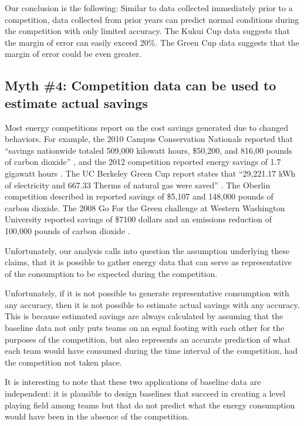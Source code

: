 \documentclass[jou]{apa} %
\begin{document}
Our conclusion is the following: Similar to data collected immediately prior to a
competition, data collected from prior years can predict normal conditions during the
competition with only limited accuracy.  The Kukui Cup data suggests that the margin of error can easily
exceed 20\%.  The Green Cup data suggests that the margin of error could be even greater. 


\subsection{Myth \#4: Competition data can be used to estimate actual savings}

Most energy competitions report on the cost savings generated due to changed behaviors.
For example, the 2010 Campus Conservation Nationals reported that ``savings nationwide
totaled 509,000 kilowatt hours, \$50,200, and 816,00 pounds of carbon dioxide''
\cite{Willens2010}, and the 2012 competition reported energy savings of  
1.7 gigawatt hours \cite{Cunningham12}.  The UC Berkeley Green Cup report states that
``29,221.17 kWh of electricity and 667.33 Therms of natural gas were saved''
\cite{Dhong2011}. The Oberlin competition described in \cite{Petersen07a} reported savings
of \$5,107 and 148,000 pounds of carbon dioxide. The 2008 Go For the Green challenge at
Western Washington University reported savings of \$7100 dollars and an emissions
reduction of 100,000 pounds of carbon dioxide \cite{Mauney-thesis}.

Unfortunately, our analysis calls into question the assumption underlying these claims,
that it is possible to gather energy data that can serve as representative of the
consumption to be expected during the competition. 

Unfortunately, if it is not possible to generate representative consumption with any
accuracy, then it is not possible to estimate actual savings with any accuracy.  This is
because estimated savings are always calculated by assuming that the baseline data not
only puts teams on an equal footing with each other for the purposes of the competition,
but also represents an accurate prediction of what each team would have consumed during
the time interval of the competition, had the competition not taken place.  

It is interesting to note that these two applications of baseline data are
independent: it is plausible to design baselines that succeed in creating a
level playing field among teams but that do not predict what the energy
consumption would have been in the absence of the competition.
\end{document}
